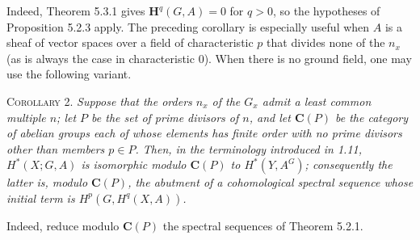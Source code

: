 Indeed, Theorem 5.3.1 gives $\mathbf H^q(G,A)=0$ for $q>0$, so the hypotheses
of Proposition 5.2.3 apply. The preceding corollary is especially useful when
$A$ is a sheaf of vector spaces over a field of characteristic $p$ that
divides none of the $n_x$ (as is always the case in characteristic $0$). When
there is no ground field, one may use the following variant.

\textsc{Corollary 2.} \textit{Suppose that the orders $n_x$ of the
$G_x$ admit a least common multiple $n$; let $P$ be the set of prime divisors
of $n$, and let ${\mathbf C}(P)$ be the category of abelian groups each of whose elements
has finite order with no prime divisors other than members $p\in P$. Then, in
the terminology introduced in \textup{1.11}, $H^*(X;G,A)$ is isomorphic modulo ${\mathbf C}(P)$
to $H^*(Y,A^G)$; consequently the latter is, modulo ${\mathbf C}(P)$, the abutment of a
cohomological spectral sequence whose initial term is $H^p(G,H^q(X,A))$.}

Indeed, reduce modulo ${\mathbf C}(P)$ the spectral sequences of Theorem 5.2.1.

